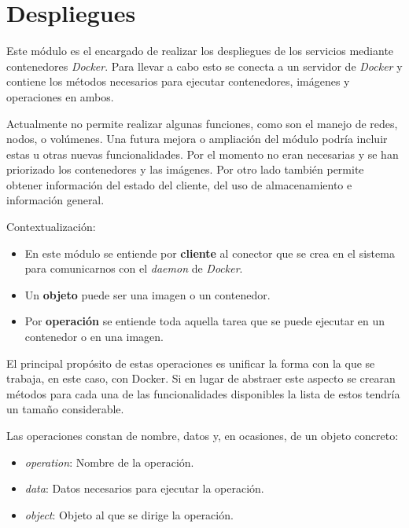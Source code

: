 \section{Despliegues}

Este módulo es el encargado de realizar los despliegues de los servicios mediante contenedores \textit{Docker}. Para llevar a cabo esto se conecta a un servidor de \textit{Docker} y contiene los métodos necesarios para ejecutar contenedores, imágenes y operaciones en ambos.

Actualmente no permite realizar algunas funciones, como son el manejo de redes, nodos, o volúmenes. Una futura mejora o ampliación del módulo podría incluir estas u otras nuevas funcionalidades. Por el momento no eran necesarias y se han priorizado los contenedores y las imágenes. Por otro lado también permite obtener información del estado del cliente, del uso de almacenamiento e información general.

\bigskip
Contextualización:
\begin{itemize}
	\item En este módulo se entiende por \textbf{cliente} al conector que se crea en el sistema para comunicarnos con el \textit{daemon} de \textit{Docker}.
	\item Un \textbf{objeto} puede ser una imagen o un contenedor.
	\item Por \textbf{operación} se entiende toda aquella tarea que se puede ejecutar en un contenedor o en una imagen.
\end{itemize}

\bigskip


El principal propósito de estas operaciones es unificar la forma con la que se trabaja, en este caso, con Docker. Si en lugar de abstraer este aspecto se crearan métodos para cada una de las funcionalidades disponibles la lista de estos tendría un tamaño considerable.

Las operaciones constan de nombre, datos y, en ocasiones, de un objeto concreto:
\begin{itemize}
	\item \textit{operation}: Nombre de la operación.
	\item \textit{data}: Datos necesarios para ejecutar la operación.
	\item \textit{object}: Objeto al que se dirige la operación.
\end{itemize}


